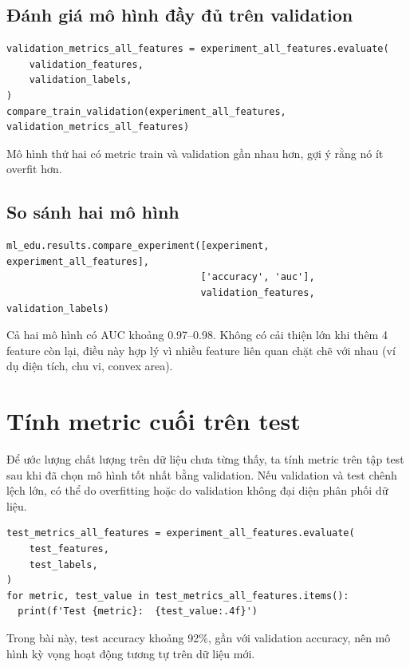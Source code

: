 \documentclass[12pt,a4paper]{article}
\begin{document}
\subsection{Đánh giá mô hình đầy đủ trên validation}

\begin{lstlisting}
validation_metrics_all_features = experiment_all_features.evaluate(
    validation_features,
    validation_labels,
)
compare_train_validation(experiment_all_features, validation_metrics_all_features)
\end{lstlisting}

\begin{luuy}[title={Nhận xét (từ notebook)}]
Mô hình thứ hai có metric train và validation gần nhau hơn, gợi ý rằng nó ít overfit hơn.
\end{luuy}

\subsection{So sánh hai mô hình}

\begin{lstlisting}
ml_edu.results.compare_experiment([experiment, experiment_all_features],
                                  ['accuracy', 'auc'],
                                  validation_features, validation_labels)
\end{lstlisting}

\begin{ynghia}[title={Diễn giải kết quả (từ notebook)}]
Cả hai mô hình có AUC khoảng 0.97--0.98.
Không có cải thiện lớn khi thêm 4 feature còn lại, điều này hợp lý vì nhiều feature liên quan chặt chẽ với nhau (ví dụ diện tích, chu vi, convex area).
\end{ynghia}

\newpage

\section{Tính metric cuối trên test}

\begin{dongco}[title={Vì sao cần tập test?}]
Để ước lượng chất lượng trên dữ liệu chưa từng thấy, ta tính metric trên tập test sau khi đã chọn mô hình tốt nhất bằng validation.
Nếu validation và test chênh lệch lớn, có thể do overfitting hoặc do validation không đại diện phân phối dữ liệu.
\end{dongco}

\begin{lstlisting}
test_metrics_all_features = experiment_all_features.evaluate(
    test_features,
    test_labels,
)
for metric, test_value in test_metrics_all_features.items():
  print(f'Test {metric}:  {test_value:.4f}')
\end{lstlisting}

\begin{luuy}[title={Kết luận (từ notebook)}]
Trong bài này, test accuracy khoảng 92\%, gần với validation accuracy, nên mô hình kỳ vọng hoạt động tương tự trên dữ liệu mới.
\end{luuy}
\end{document}
